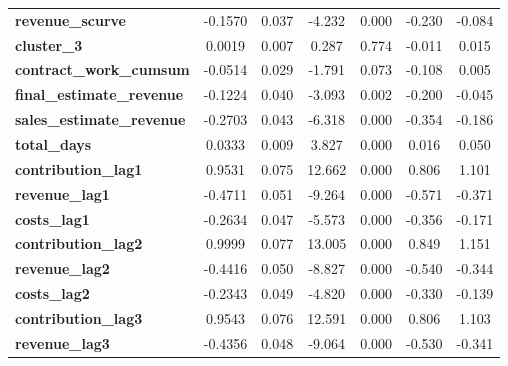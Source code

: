 \begin{center}
\begin{tabular}{lcccccc}
\textbf{revenue\_scurve}                    &      -0.1570  &        0.037     &    -4.232  &         0.000        &       -0.230    &       -0.084     \\
\textbf{cluster\_3}                         &       0.0019  &        0.007     &     0.287  &         0.774        &       -0.011    &        0.015     \\
\textbf{contract\_work\_cumsum}             &      -0.0514  &        0.029     &    -1.791  &         0.073        &       -0.108    &        0.005     \\
\textbf{final\_estimate\_revenue}           &      -0.1224  &        0.040     &    -3.093  &         0.002        &       -0.200    &       -0.045     \\
\textbf{sales\_estimate\_revenue}           &      -0.2703  &        0.043     &    -6.318  &         0.000        &       -0.354    &       -0.186     \\
\textbf{total\_days}                        &       0.0333  &        0.009     &     3.827  &         0.000        &        0.016    &        0.050     \\
\textbf{contribution\_lag1}                 &       0.9531  &        0.075     &    12.662  &         0.000        &        0.806    &        1.101     \\
\textbf{revenue\_lag1}                      &      -0.4711  &        0.051     &    -9.264  &         0.000        &       -0.571    &       -0.371     \\
\textbf{costs\_lag1}                        &      -0.2634  &        0.047     &    -5.573  &         0.000        &       -0.356    &       -0.171     \\
\textbf{contribution\_lag2}                 &       0.9999  &        0.077     &    13.005  &         0.000        &        0.849    &        1.151     \\
\textbf{revenue\_lag2}                      &      -0.4416  &        0.050     &    -8.827  &         0.000        &       -0.540    &       -0.344     \\
\textbf{costs\_lag2}                        &      -0.2343  &        0.049     &    -4.820  &         0.000        &       -0.330    &       -0.139     \\
\textbf{contribution\_lag3}                 &       0.9543  &        0.076     &    12.591  &         0.000        &        0.806    &        1.103     \\
\textbf{revenue\_lag3}                      &      -0.4356  &        0.048     &    -9.064  &         0.000        &       -0.530    &       -0.341     \\

\end{tabular}
\end{center}
